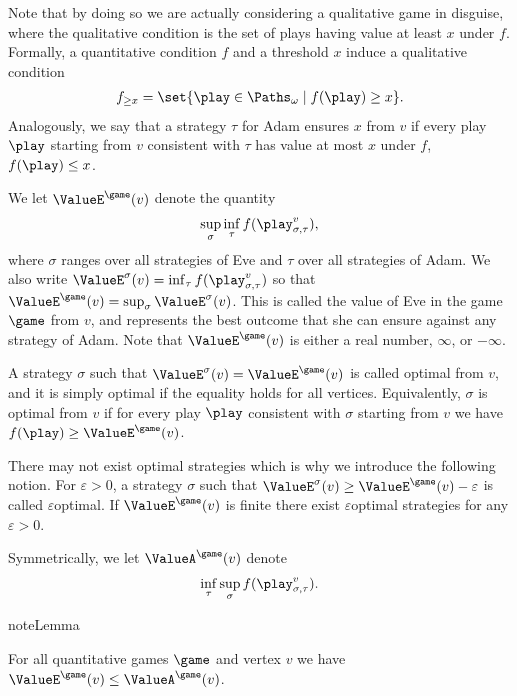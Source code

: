 \documentclass[letterpaper,10pt,english]{sphinxmanual}
\begin{document}
Note that by doing so we are actually considering a qualitative game in
disguise, where the qualitative condition is the set of plays having
value at least \(x\) under \(f\). Formally, a quantitative condition \(f\) and
a threshold \(x\) induce a qualitative condition
\begin{equation*}
\begin{split}f_{\ge x} = \set{\play \in \Paths_\omega \mid f(\play) \ge x}.\end{split}
\end{equation*}
Analogously, we say that a strategy \(\tau\) for Adam ensures \(x\)
from \(v\) if every play \(\play\) starting from \(v\) consistent with \(\tau\)
has value at most \(x\) under \(f\),  \(f(\play) \le x\).

We let \(\ValueE^{\game}(v)\) denote the quantity
\begin{equation*}
\begin{split}\sup_{\sigma} \inf_{\tau} f(\play_{\sigma,\tau}^{v}),\end{split}
\end{equation*}
where \(\sigma\) ranges over all strategies of Eve and \(\tau\) over all strategies of Adam. We also write
\(\ValueE^{\sigma}(v) = \inf_{\tau} f(\play_{\sigma,\tau}^{v})\) so that
\(\ValueE^{\game}(v) = \sup_{\sigma} \ValueE^\sigma(v)\). This is called
the value of Eve in the game \(\game\) from \(v\), and represents the best
outcome that she can ensure against any strategy of Adam. Note that
\(\ValueE^{\game}(v)\) is either a real number, \(\infty\), or \(-\infty\).

A strategy \(\sigma\) such that \(\ValueE^\sigma(v) = \ValueE^{\game}(v)\)
is called optimal from \(v\), and it is simply optimal if the
equality holds for all vertices. Equivalently, \(\sigma\) is optimal from
\(v\) if for every play \(\play\) consistent with \(\sigma\) starting from \(v\)
we have \(f(\play) \ge \ValueE^{\game}(v)\).

There may not exist optimal strategies which is why we introduce the
following notion. For \(\varepsilon > 0\), a strategy \(\sigma\) such that
\(\ValueE^\sigma(v) \ge \ValueE^{\game}(v) - \varepsilon\) is called
\(\varepsilon\)\sphinxhyphen{}optimal. If \(\ValueE^{\game}(v)\) is finite there
exist \(\varepsilon\)\sphinxhyphen{}optimal strategies for any \(\varepsilon > 0\).

Symmetrically, we let \(\ValueA^{\game}(v)\) denote
\begin{equation*}
\begin{split}\inf_{\tau} \sup_{\sigma} f(\play_{\sigma,\tau}^{v}).\end{split}
\end{equation*}
\begin{sphinxadmonition}{note}{Lemma}

For all quantitative games \(\game\) and vertex \(v\) we have
\(\ValueE^{\game}(v) \le \ValueA^{\game}(v)\).
\end{sphinxadmonition}
\end{document}
